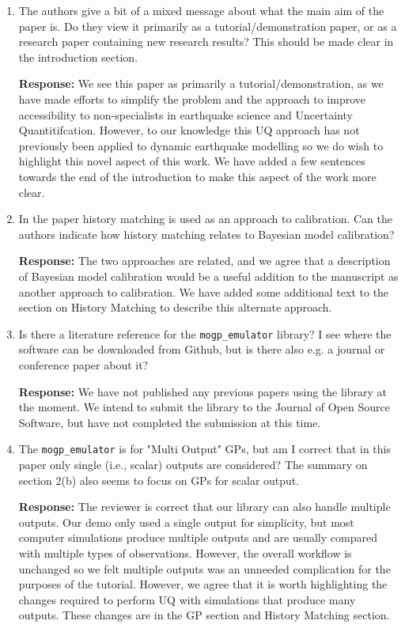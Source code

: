 \documentclass{article}
\begin{document}
\begin{enumerate}

\item The authors give a bit of a mixed message about what the main aim of the paper is. Do they view it primarily as a tutorial/demonstration paper, or as a research paper containing new research results? This should be made clear in the introduction section.


  \textbf{Response:} We see this paper as primarily a tutorial/demonstration,
  as we have made efforts to simplify the problem and the approach to
  improve accessibility to non-specialists in earthquake science and
  Uncertainty Quantitifcation. However, to our knowledge this UQ approach
  has not previously been applied to dynamic earthquake modelling so we
  do wish to highlight this novel aspect of this work. We have added a few
  sentences towards the end of the
  introduction to make this aspect of the work more clear.

\item In the paper history matching is used as an approach to calibration. Can the authors indicate how history matching relates to Bayesian model calibration?

  \textbf{Response:} The two approaches are related, and we agree that a
  description of Bayesian model calibration would be a useful addition to
  the manuscript as another approach to calibration. We have added some
  additional text to the section on History Matching to describe this
  alternate approach.

\item Is there a literature reference for the \texttt{mogp\_emulator} library? I see where the software can be downloaded from Github, but is there also e.g. a journal or conference paper about it?

  \textbf{Response:} We have not published any previous papers using the library
  at the moment. We intend to submit the library to the Journal of Open Source
  Software, but have not completed the submission at this time.

\item The \texttt{mogp\_emulator} is for "Multi Output" GPs, but am I correct that in this paper only single (i.e., scalar) outputs are considered? The summary on section 2(b) also seems to focus on GPs for scalar output.

  \textbf{Response:} The reviewer is correct that our library can also handle
  multiple outputs. Our demo only used a single output for simplicity, but
  most computer simulations produce multiple
  outputs and are usually compared with multiple types of observations.
  However, the overall workflow is unchanged so we felt multiple outputs was an
  unneeded complication for the purposes of the tutorial.
  However, we agree that it is worth highlighting the changes required to
  perform UQ with simulations that produce many outputs. These changes are
  in the GP section and History Matching section.


\end{enumerate}
\end{document}

